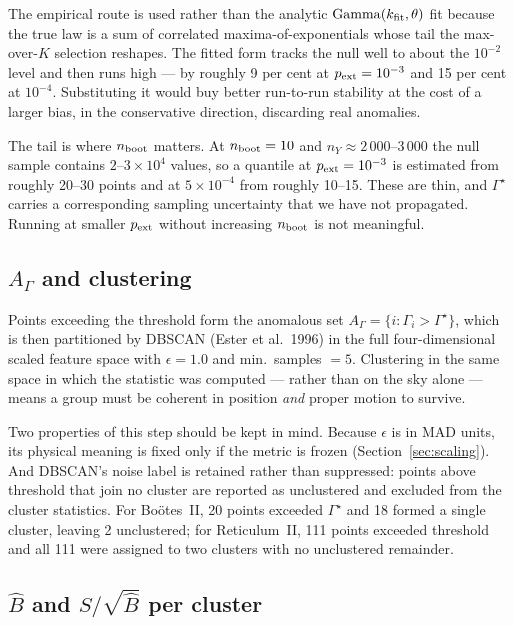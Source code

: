 \documentclass[11pt,a4paper]{article}
\newcommand{\Ups}{\Upsilon}                  %
\newcommand{\Gam}{\Gamma}                    %
\newcommand{\Ups}{\Upsilon}
\newcommand{\Gam}{\Gamma}
\newcommand{\Gstar}{\Gamma^{\star}}
\newcommand{\Bhat}{\hat{B}}
\newcommand{\srb}{S/\sqrt{\Bhat}}
\begin{document}
The empirical route is used rather than the analytic $\mathrm{Gamma}(k_{\rm fit},\theta)$ fit
because the true law is a sum of correlated maxima-of-exponentials whose tail the max-over-$K$
selection reshapes. The fitted form tracks the null well to about the $10^{-2}$ level and then runs
high --- by roughly 9 per cent at $p_{\rm ext} = 10^{-3}$ and 15 per cent at $10^{-4}$.
Substituting it would buy better run-to-run stability at the cost of a larger bias, in the
conservative direction, discarding real anomalies.

The tail is where $n_{\rm boot}$ matters. At $n_{\rm boot} = 10$ and
$n_Y \approx 2\,000$--$3\,000$ the null sample contains $2$--$3\times10^4$ values, so a quantile at
$p_{\rm ext} = 10^{-3}$ is estimated from roughly 20--30 points and at $5\times10^{-4}$ from roughly
10--15. These are thin, and $\Gstar$ carries a corresponding sampling uncertainty that we have not
propagated. Running at smaller $p_{\rm ext}$ without increasing $n_{\rm boot}$ is not meaningful.

\subsection{$A_\Gam$ and clustering}

Points exceeding the threshold form the anomalous set
$A_\Gam = \{i : \Gam_i > \Gstar\}$, which is then partitioned by DBSCAN (Ester et al.\ 1996) in the
full four-dimensional scaled feature space with $\epsilon = 1.0$ and min.\ samples $= 5$.
Clustering in the same space in which the statistic was computed --- rather than on the sky alone
--- means a group must be coherent in position \emph{and} proper motion to survive.

Two properties of this step should be kept in mind. Because $\epsilon$ is in MAD units, its
physical meaning is fixed only if the metric is frozen (Section~\ref{sec:scaling}). And DBSCAN's
noise label is retained rather than suppressed: points above threshold that join no cluster are
reported as unclustered and excluded from the cluster statistics. For Bo\"otes~II, 20 points
exceeded $\Gstar$ and 18 formed a single cluster, leaving 2 unclustered; for Reticulum~II, 111
points exceeded threshold and all 111 were assigned to two clusters with no unclustered remainder.

\subsection{$\Bhat$ and $\srb$ per cluster}
\label{sec:srb}
\end{document}

